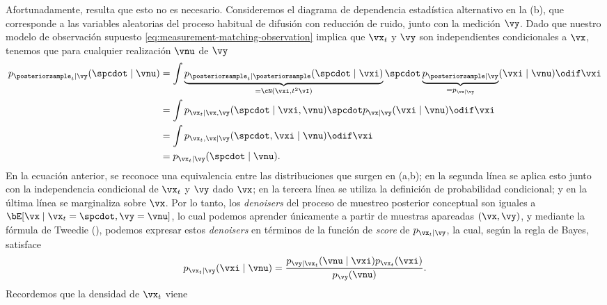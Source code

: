 \documentclass[../../book-main_es.tex]{subfiles}
\begin{document}
Afortunadamente, resulta que esto no es necesario.
Consideremos el diagrama de dependencia estadística alternativo en la
(b), que corresponde a las variables aleatorias
del proceso habitual de difusión con reducción de ruido, junto con la medición $\vy$.
Dado que nuestro modelo de observación supuesto
\eqref{eq:measurement-matching-observation}
implica que $\vx_t$ y $\vy$ son independientes condicionales a $\vx$, tenemos que para
cualquier realización $\vnu$ de $\vy$
\begin{equation}\label{eq:conditional-denoising-conditioning-order-irrelevant}
    \begin{split}
        p_{\posteriorsample_t\mid \vy}(\spcdot \mid \vnu)
        &= \int
        \underbrace{p_{\posteriorsample_t \mid
        \posteriorsample}(\spcdot\mid \vxi)}_{=
        \cN(\vxi, t^2 \vI)}
        \spcdot \underbrace{p_{\posteriorsample \mid \vy}}_{=
        p_{\vx\mid \vy}}(\vxi \mid
        \vnu)
        \odif \vxi
        \\
        &=
        \int p_{\vx_t \mid \vx, \vy}(\spcdot\mid \vxi, \vnu) \spcdot p_{\vx \mid
        \vy}(\vxi\mid \vnu) \odif \vxi
        \\
        &=
        \int p_{\vx_t, \vx \mid \vy}(\spcdot, \vxi \mid \vnu) \odif \vxi
        \\
        &= p_{\vx_t \mid \vy}(\spcdot\mid \vnu).
    \end{split}
\end{equation}
En la ecuación anterior, se reconoce una equivalencia entre las distribuciones
que surgen en  (a,b); en la segunda línea se aplica esto
junto con la independencia condicional de $\vx_t$ y $\vy$ dado $\vx$; en la
tercera línea se utiliza la definición de probabilidad condicional; y en la última línea
se marginaliza sobre $\vx$.
Por lo tanto, los \textit{denoisers} del proceso de muestreo posterior conceptual son iguales a
$\bE[\vx \mid \vx_t=\spcdot, \vy=\vnu]$, lo cual podemos aprender únicamente
a partir de muestras apareadas $(\vx,
\vy)$,
y mediante la fórmula de Tweedie (), podemos expresar estos \textit{denoisers} en
términos de la función de \textit{score} de $p_{\vx_t \mid \vy}$, la cual, según la regla de Bayes,
satisface
\begin{equation}
    p_{\vx_t \mid \vy}(\vxi \mid \vnu)
    = \frac{p_{\vy \mid \vx_t}(\vnu \mid \vxi) p_{\vx_t}(\vxi)}{p_{\vy}(\vnu)}.
\end{equation}
Recordemos que la densidad de $\vx_t$ viene
\end{document}
